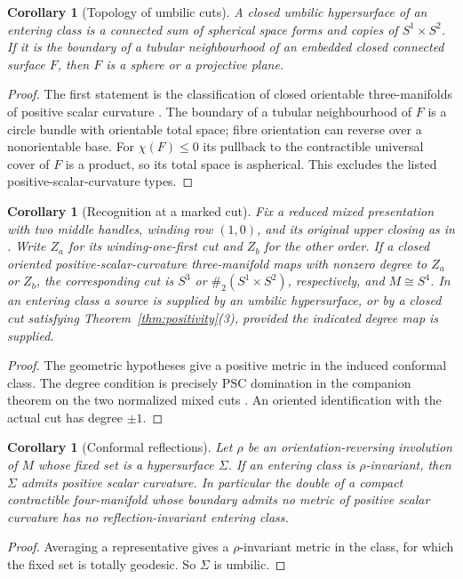 \documentclass[11pt,letterpaper]{article}
\numberwithin{equation}{section}
\newtheorem{corollary}[theorem]{Corollary}
\theoremstyle{definition}
\begin{document}
\begin{corollary}[Topology of umbilic cuts]\label{cor:topology}
A closed umbilic hypersurface of an entering class is a connected sum of
spherical space forms and copies of \(S^1\times S^2\). If it is the
boundary of a tubular neighbourhood of an embedded closed connected surface
\(F\), then \(F\) is a sphere or a projective plane.
\end{corollary}
\begin{proof}
The first statement is the classification of closed orientable
three-manifolds of positive scalar curvature
\cite{GromovLawson1980Surgery,Perelman2003Surgery}. The boundary of a
tubular neighbourhood of \(F\) is a circle bundle with orientable
total space; fibre orientation can reverse over a nonorientable base.
For \(\chi(F)\le0\) its pullback to the contractible universal cover
of \(F\) is a product, so its total space is aspherical. This excludes
the listed positive-scalar-curvature types.
\end{proof}

\begin{corollary}[Recognition at a marked cut]\label{cor:marked}
Fix a reduced mixed presentation with two middle handles, winding row
\((1,0)\), and its original upper closing as in \cite{Baker2026HandleCuts}.
Write \(Z_a\) for its winding-one-first cut and \(Z_b\) for the other order.
If a closed oriented positive-scalar-curvature three-manifold maps with
nonzero degree to \(Z_a\) or \(Z_b\), the corresponding cut is
\(S^3\) or \(\#_2(S^1\times S^2)\), respectively, and \(M\cong S^4\).
In an entering class a source is supplied by an umbilic hypersurface,
or by a closed cut satisfying Theorem~\ref{thm:positivity}(3), provided
the indicated degree map is supplied.
\end{corollary}
\begin{proof}
The geometric hypotheses give a positive metric in the induced conformal
class. The degree condition is precisely PSC domination in the companion
theorem on the two normalized mixed cuts \cite{Baker2026HandleCuts}.
An oriented identification with the actual cut has degree \(\pm1\).
\end{proof}

\begin{corollary}[Conformal reflections]\label{cor:reflection}
Let \(\rho\) be an orientation-reversing involution of \(M\) whose fixed
set is a hypersurface \(\Sigma\). If an entering class is
\(\rho\)-invariant, then \(\Sigma\) admits positive scalar curvature. In
particular the double of a compact contractible four-manifold whose
boundary admits no metric of positive scalar curvature has no
reflection-invariant entering class.
\end{corollary}
\begin{proof}
Averaging a representative gives a \(\rho\)-invariant metric in the class,
for which the fixed set is totally geodesic. So \(\Sigma\) is umbilic.
\end{proof}
\end{document}
